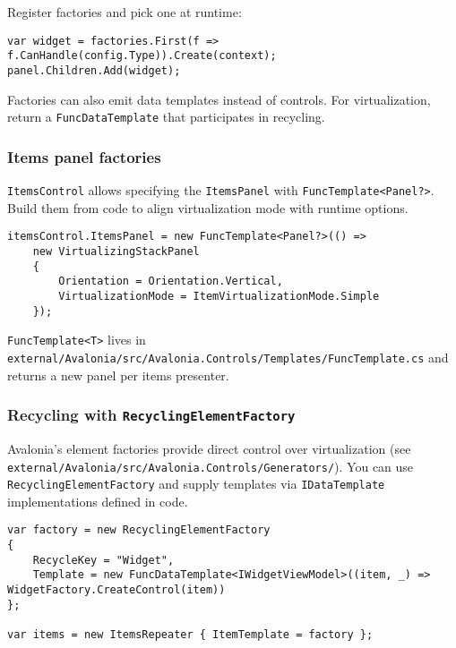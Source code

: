 Register factories and pick one at runtime:

\begin{lstlisting}
var widget = factories.First(f => f.CanHandle(config.Type)).Create(context);
panel.Children.Add(widget);
\end{lstlisting}

Factories can also emit data templates instead of controls. For
virtualization, return a \passthrough{\lstinline!FuncDataTemplate!} that
participates in recycling.

\subsubsection{Items panel factories}\label{items-panel-factories}

\passthrough{\lstinline!ItemsControl!} allows specifying the
\passthrough{\lstinline!ItemsPanel!} with
\passthrough{\lstinline!FuncTemplate<Panel?>!}. Build them from code to
align virtualization mode with runtime options.

\begin{lstlisting}
itemsControl.ItemsPanel = new FuncTemplate<Panel?>(() =>
    new VirtualizingStackPanel
    {
        Orientation = Orientation.Vertical,
        VirtualizationMode = ItemVirtualizationMode.Simple
    });
\end{lstlisting}

\passthrough{\lstinline!FuncTemplate<T>!} lives in
\passthrough{\lstinline!external/Avalonia/src/Avalonia.Controls/Templates/FuncTemplate.cs!}
and returns a new panel per items presenter.

\subsubsection{\texorpdfstring{Recycling with
\texttt{RecyclingElementFactory}}{Recycling with RecyclingElementFactory}}\label{recycling-with-recyclingelementfactory}

Avalonia's element factories provide direct control over virtualization
(see
\passthrough{\lstinline!external/Avalonia/src/Avalonia.Controls/Generators/!}).
You can use \passthrough{\lstinline!RecyclingElementFactory!} and supply
templates via \passthrough{\lstinline!IDataTemplate!} implementations
defined in code.

\begin{lstlisting}
var factory = new RecyclingElementFactory
{
    RecycleKey = "Widget",
    Template = new FuncDataTemplate<IWidgetViewModel>((item, _) => WidgetFactory.CreateControl(item))
};

var items = new ItemsRepeater { ItemTemplate = factory };
\end{lstlisting}

